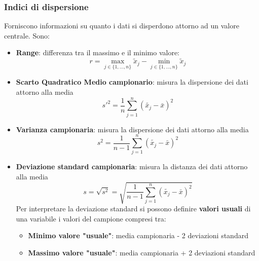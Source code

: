 \documentclass[a4paper]{article}
\theoremstyle{break}
\theoremstyle{break}
\theoremstyle{break}
\theoremstyle{break}
\begin{document}
\subsubsection{Indici di dispersione}
Forniscono informazioni su quanto i dati si disperdono attorno ad un valore centrale. Sono:
\begin{itemize}
	\item \textbf{Range}: differenza tra il massimo e il minimo valore:
	      \[
		      r = \underset{j \in \{1, \ldots, n\} }{\max} \tilde{x}_j - \underset{j \in \{1, \ldots, n\} }{\min} \tilde{x}_j
	      \]
	\item \textbf{Scarto Quadratico Medio campionario}: misura la dispersione dei dati attorno alla media
	      \[
		      s'^2 = \frac{1}{n} \sum_{j=1}^{n} (\tilde{x_j} - \bar{x})^2
	      \]
	\item \textbf{Varianza campionaria}: misura la dispersione dei dati attorno alla media
	      \[
		      s^2 = \frac{1}{n-1} \sum_{j=1}^{n} (\tilde{x_j} - \bar{x})^2
	      \]
	\item \textbf{Deviazione standard campionaria}: misura la distanza dei dati attorno alla media
	      \[
		      s = \sqrt{s^2} = \sqrt{\frac{1}{n-1} \sum_{j=1}^{n} (\tilde{x_j} - \bar{x})^2}
	      \]
	      Per interpretare la deviazione standard si possono definire
	      \textbf{valori usuali} di una variabile i valori del campione compresi tra:
	      \begin{itemize}
		      \item \textbf{Minimo valore "usuale"}: media campionaria - 2 deviazioni standard
		      \item \textbf{Massimo valore "usuale"}: media campionaria + 2 deviazioni standard
	      \end{itemize}

\end{itemize}
\end{document}
